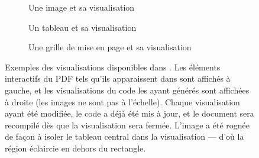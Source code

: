 \begin{figure}[h]
  \centering
  \begin{subfigure}[t]{\linewidth}
    \begin{minipage}{0.5\linewidth}
       \centering
    \end{minipage}
    \begin{minipage}{0.5\linewidth}
        \centering
    \end{minipage}
    \caption{Une image et sa visualisation}
    \label{subfig:ilatex-visualisation-image}
    \bigskip
  \end{subfigure}
  \begin{subfigure}[t]{\linewidth}
    \begin{minipage}{0.5\linewidth}
       \centering
    \end{minipage}
    \begin{minipage}{0.5\linewidth}
        \centering
    \end{minipage}
    \caption{Un tableau et sa visualisation}
    \label{subfig:ilatex-visualisation-tableau}
    \bigskip
  \end{subfigure}
  \begin{subfigure}[t]{\linewidth}
    \begin{minipage}{0.5\linewidth}
       \centering
    \end{minipage}
    \begin{minipage}{0.5\linewidth}
        \centering
    \end{minipage}
    \caption{Une grille de mise en page et sa visualisation}
    \label{subfig:ilatex-visualisation-grille}
  \end{subfigure}
  \caption{Exemples des visualisations disponibles dans \iLaTeX{}.
  Les éléments interactifs du PDF tels qu'ils apparaissent dans \iLaTeX{} sont affichés à gauche, et les visualisations du code les ayant générés sont affichées à droite (les images ne sont pas à l'échelle).
  Chaque visualisation ayant été modifiée, le code a déjà été mis à jour, et le document sera recompilé dès que la visualisation sera fermée. 
   L'image a été rognée de façon à isoler le tableau central dans la visualisation --- d'où la région éclaircie en dehors du rectangle.
}
\end{figure}

